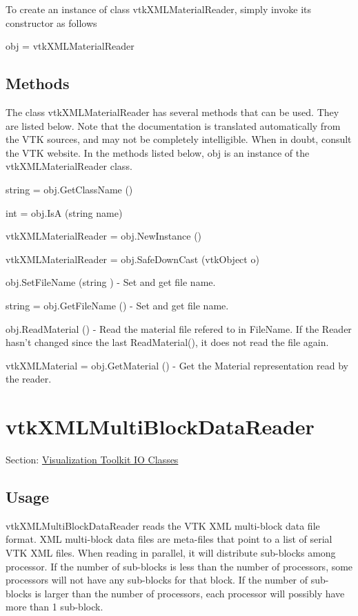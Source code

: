 To create an instance of class vtk\-X\-M\-L\-Material\-Reader, simply invoke its constructor as follows \begin{DoxyVerb}  obj = vtkXMLMaterialReader
\end{DoxyVerb}
 \hypertarget{vtkwidgets_vtkxyplotwidget_Methods}{}\subsection{Methods}\label{vtkwidgets_vtkxyplotwidget_Methods}
The class vtk\-X\-M\-L\-Material\-Reader has several methods that can be used. They are listed below. Note that the documentation is translated automatically from the V\-T\-K sources, and may not be completely intelligible. When in doubt, consult the V\-T\-K website. In the methods listed below, {\ttfamily obj} is an instance of the vtk\-X\-M\-L\-Material\-Reader class. 
\begin{DoxyItemize}
\item {\ttfamily string = obj.\-Get\-Class\-Name ()}  
\item {\ttfamily int = obj.\-Is\-A (string name)}  
\item {\ttfamily vtk\-X\-M\-L\-Material\-Reader = obj.\-New\-Instance ()}  
\item {\ttfamily vtk\-X\-M\-L\-Material\-Reader = obj.\-Safe\-Down\-Cast (vtk\-Object o)}  
\item {\ttfamily obj.\-Set\-File\-Name (string )} -\/ Set and get file name.  
\item {\ttfamily string = obj.\-Get\-File\-Name ()} -\/ Set and get file name.  
\item {\ttfamily obj.\-Read\-Material ()} -\/ Read the material file refered to in File\-Name. If the Reader hasn't changed since the last Read\-Material(), it does not read the file again.  
\item {\ttfamily vtk\-X\-M\-L\-Material = obj.\-Get\-Material ()} -\/ Get the Material representation read by the reader.  
\end{DoxyItemize}\hypertarget{vtkio_vtkxmlmultiblockdatareader}{}\section{vtk\-X\-M\-L\-Multi\-Block\-Data\-Reader}\label{vtkio_vtkxmlmultiblockdatareader}
Section\-: \hyperlink{sec_vtkio}{Visualization Toolkit I\-O Classes} \hypertarget{vtkwidgets_vtkxyplotwidget_Usage}{}\subsection{Usage}\label{vtkwidgets_vtkxyplotwidget_Usage}
vtk\-X\-M\-L\-Multi\-Block\-Data\-Reader reads the V\-T\-K X\-M\-L multi-\/block data file format. X\-M\-L multi-\/block data files are meta-\/files that point to a list of serial V\-T\-K X\-M\-L files. When reading in parallel, it will distribute sub-\/blocks among processor. If the number of sub-\/blocks is less than the number of processors, some processors will not have any sub-\/blocks for that block. If the number of sub-\/blocks is larger than the number of processors, each processor will possibly have more than 1 sub-\/block.


